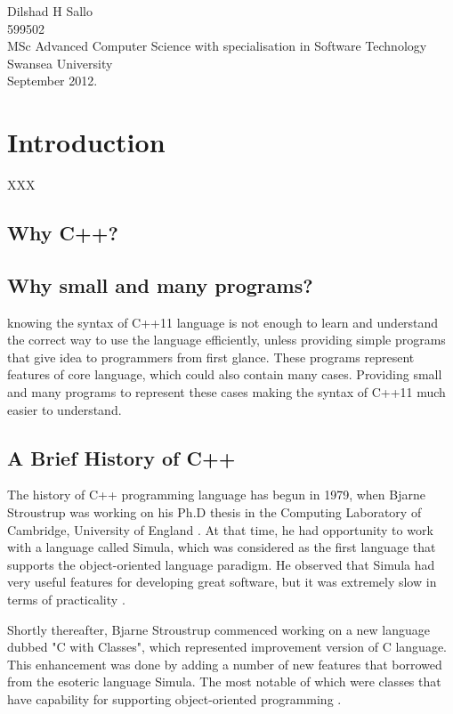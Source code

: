 \documentclass[11pt]{report}
\begin{document}
\begin{flushright}
Dilshad H Sallo\\
599502\\
MSc Advanced Computer Science with specialisation in Software Technology\\
Swansea University\\
September 2012.
\end{flushright}

\tableofcontents


\chapter{Introduction}
\label{cha:intro}

XXX

\section{Why C++?}
\label{sec: why C++}

\section{Why small and many programs?}
\label{sec:small and many programs}
knowing the syntax of C++11 language is not enough to learn and understand the correct way to use the language efficiently, unless providing  simple  programs that give idea to programmers from first glance.  These programs represent features of core language, which could also contain many cases. Providing small and many programs to represent these cases making the syntax of C++11 much easier to understand.

\section{A Brief History of C++}
\label{sec: History of C++}
The history of C++ programming language has begun in 1979, when Bjarne Stroustrup was working on his Ph.D thesis in the Computing Laboratory of Cambridge, University of England \cite{StroustrupHistory}. At that time, he had opportunity to work with a language called Simula, which was considered as the first language that supports the object-oriented language paradigm. He observed that Simula had very useful features for developing great software, but it was extremely slow in terms of practicality \cite{Stroustrup:2012:Cpp11}.

Shortly thereafter, Bjarne Stroustrup commenced working on a new language dubbed "C with Classes", which represented improvement version of C language. This enhancement was done by adding a number of new features that borrowed from the esoteric language Simula. The most notable of which were classes that have capability for supporting object-oriented programming \cite{StroustrupHistory}. 
\end{document}
